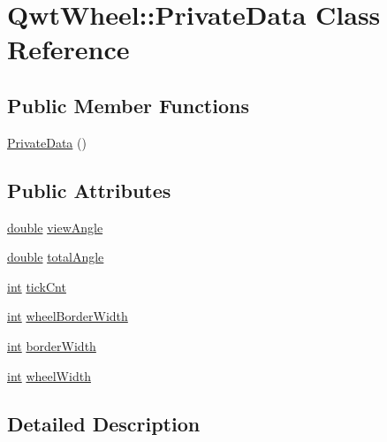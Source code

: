 \hypertarget{class_qwt_wheel_1_1_private_data}{\section{Qwt\-Wheel\-:\-:Private\-Data Class Reference}
\label{class_qwt_wheel_1_1_private_data}
}
\subsection*{Public Member Functions}
\begin{DoxyCompactItemize}
\item 
\hyperlink{class_qwt_wheel_1_1_private_data_a2b993fd3f37744bce026028114c05c93}{Private\-Data} ()
\end{DoxyCompactItemize}
\subsection*{Public Attributes}
\begin{DoxyCompactItemize}
\item 
\hyperlink{_super_l_u_support_8h_a8956b2b9f49bf918deed98379d159ca7}{double} \hyperlink{class_qwt_wheel_1_1_private_data_ae7b0c4f852b3a3c5f68d084f0d8d2b08}{view\-Angle}
\item 
\hyperlink{_super_l_u_support_8h_a8956b2b9f49bf918deed98379d159ca7}{double} \hyperlink{class_qwt_wheel_1_1_private_data_a91e776794389220d7d8420f43b1e9b0c}{total\-Angle}
\item 
\hyperlink{ioapi_8h_a787fa3cf048117ba7123753c1e74fcd6}{int} \hyperlink{class_qwt_wheel_1_1_private_data_ad03241813acaf8aea8ab0fc0004bc372}{tick\-Cnt}
\item 
\hyperlink{ioapi_8h_a787fa3cf048117ba7123753c1e74fcd6}{int} \hyperlink{class_qwt_wheel_1_1_private_data_a3d01d5cdc1b3fe90152e2822f8d3bc38}{wheel\-Border\-Width}
\item 
\hyperlink{ioapi_8h_a787fa3cf048117ba7123753c1e74fcd6}{int} \hyperlink{class_qwt_wheel_1_1_private_data_ae3dffcbc202569bccd374d4184add36a}{border\-Width}
\item 
\hyperlink{ioapi_8h_a787fa3cf048117ba7123753c1e74fcd6}{int} \hyperlink{class_qwt_wheel_1_1_private_data_a55492bfbbc838c7200faa144bfecab21}{wheel\-Width}
\end{DoxyCompactItemize}


\subsection{Detailed Description}


